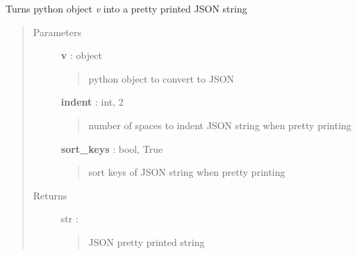 \documentclass[letterpaper,10pt,english]{sphinxmanual}
\begin{document}
\begin{fulllineitems}
\label{pytan.utils:pytan.utils.jsonify}
Turns python object \emph{v} into a pretty printed JSON string
\begin{quote}\begin{description}
\item[{Parameters}] \leavevmode
\textbf{v} : object
\begin{quote}

python object to convert to JSON
\end{quote}

\textbf{indent} : int, 2
\begin{quote}

number of spaces to indent JSON string when pretty printing
\end{quote}

\textbf{sort\_keys} : bool, True
\begin{quote}

sort keys of JSON string when pretty printing
\end{quote}

\item[{Returns}] \leavevmode
str :
\begin{quote}

JSON pretty printed string
\end{quote}

\end{description}\end{quote}

\end{fulllineitems}

\end{document}
